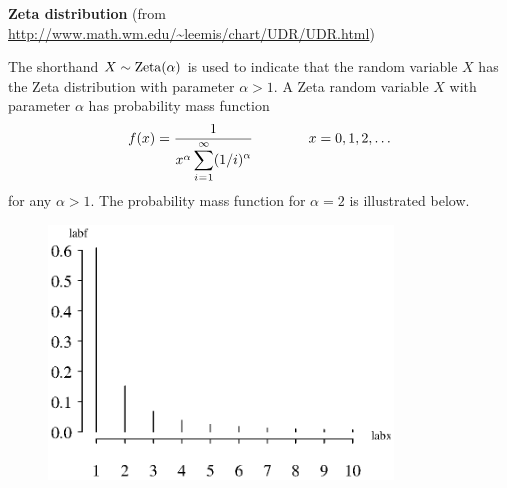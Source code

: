 \documentclass[12pt,fullpage]{article}
\begin{document}
\noindent
{\bf Zeta distribution} (from \color{blue}\url{http://www.math.wm.edu/~leemis/chart/UDR/UDR.html}\color{black})

\noindent
The shorthand $X \sim {\rm Zeta}(\alpha)$ is used to indicate that the
random variable $X$ has the Zeta distribution with parameter $\alpha > 1$.
A Zeta random variable $X$ with parameter $\alpha$ has probability mass function
$$
f(x) = \frac{1}{x ^ \alpha \displaystyle \sum_{i \kern 0.04 em = \kern 0.04 em 1} ^ {\infty}(1/i)^{\alpha} } \qquad \qquad  x = 0, 1, 2, \ldots
$$
for any $\alpha > 1$. The probability mass function for $\alpha = 2$ is illustrated below.

\begin{figure}[h!]
\begin{center}
\includegraphics[width=3.6in]{ZetaPlot.ps}
\end{center}
\end{figure}
\end{document}
